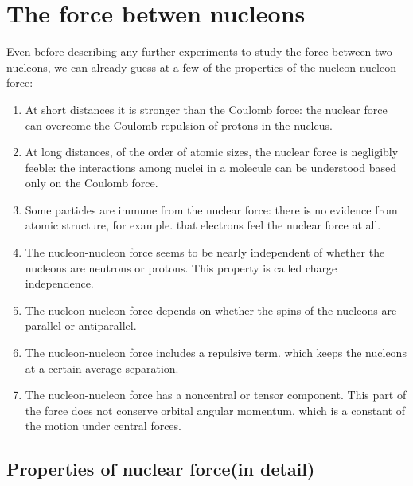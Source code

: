 \chapter{The force betwen nucleons}
Even before describing any further experiments to study the force between two nucleons, we can already guess at a few of the properties of the nucleon-nucleon force:\\
\begin{enumerate}
	\item At short distances it is stronger than the Coulomb force: the nuclear force can overcome the Coulomb repulsion of protons in the nucleus.
	\item At long distances, of the order of atomic sizes, the nuclear force is negligibly feeble: the interactions among nuclei in a molecule can be understood based only on the Coulomb force.
	\item Some particles are immune from the nuclear force: there is no evidence from atomic structure, for example. that electrons feel the nuclear force at all.
	\item The nucleon-nucleon force seems to be nearly independent of whether the nucleons are neutrons or protons. This property is called charge independence.
	\item The nucleon-nucleon force depends on whether the spins of the nucleons are parallel or antiparallel.
	\item The nucleon-nucleon force includes a repulsive term. which keeps the nucleons at a certain average separation.
	\item The nucleon-nucleon force has a noncentral or tensor component. This part of the force does not conserve orbital angular momentum. which is a constant of the motion under central forces.
\end{enumerate}
\section{Properties of nuclear force(in detail)}
